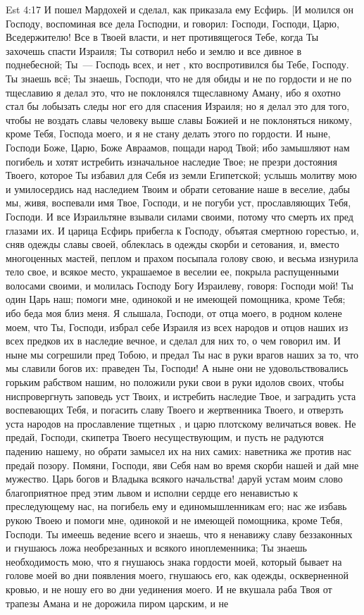 \rsbpar\vs Est 4:17 И пошел Мардохей и сделал, как приказала ему Есфирь. [И молился он Господу, воспоминая все дела Господни, и говорил: Господи, Господи, Царю, Вседержителю! Все в Твоей власти, и нет противящегося Тебе, когда Ты захочешь спасти Израиля; Ты сотворил небо и землю и все дивное в поднебесной; Ты~--- Господь всех, и нет , кто воспротивился бы Тебе, Господу. Ты знаешь всё; Ты знаешь, Господи, что не для обиды и не по гордости и не по тщеславию я делал это, что не поклонялся тщеславному Аману, ибо я охотно стал бы лобызать следы ног его для спасения Израиля; но я делал это для того, чтобы не воздать славы человеку выше славы Божией и не поклоняться никому, кроме Тебя, Господа моего, и я не стану делать этого по гордости. И ныне, Господи Боже, Царю, Боже Авраамов, пощади народ Твой; ибо замышляют нам погибель и хотят истребить изначальное наследие Твое; не презри достояния Твоего, которое Ты избавил для Себя из земли Египетской; услышь молитву мою и умилосердись над наследием Твоим и обрати сетование наше в веселие, дабы мы, живя, воспевали имя Твое, Господи, и не погуби уст, прославляющих Тебя, Господи. И все Израильтяне взывали  силами своими, потому что смерть их  пред глазами их. И царица Есфирь прибегла к Господу, объятая смертною горестью, и, сняв одежды славы своей, облеклась в одежды скорби и сетования, и, вместо многоценных мастей, пеплом и прахом посыпала голову свою, и весьма изнурила тело свое, и всякое место, украшаемое в веселии ее, покрыла распущенными волосами своими, и молилась Господу Богу Израилеву, говоря: Господи мой! Ты один Царь наш; помоги мне, одинокой и не имеющей помощника, кроме Тебя; ибо беда моя близ меня. Я слышала, Господи, от отца моего, в родном колене моем, что Ты, Господи, избрал себе Израиля из всех народов и отцов наших из всех предков их в наследие вечное, и сделал для них то, о чем говорил им. И ныне мы согрешили пред Тобою, и предал Ты нас в руки врагов наших за то, что мы славили богов их: праведен Ты, Господи! А ныне они не удовольствовались горьким рабством нашим, но положили руки свои в руки идолов своих, чтобы ниспровергнуть заповедь уст Твоих, и истребить наследие Твое, и заградить уста воспевающих Тебя, и погасить славу  Твоего и жертвенника Твоего, и отверзть уста народов на прославление тщетных , и царю плотскому величаться вовек. Не предай, Господи, скипетра Твоего  несуществующим, и пусть не радуются падению нашему, но обрати замысел их на них самих: наветника же против нас предай позору. Помяни, Господи, яви Себя нам во время скорби нашей и дай мне мужество. Царь богов и Владыка всякого начальства! даруй устам моим слово благоприятное пред этим львом и исполни сердце его ненавистью к преследующему нас, на погибель ему и единомышленникам его; нас же избавь рукою Твоею и помоги мне, одинокой и не имеющей помощника, кроме Тебя, Господи. Ты имеешь ведение всего и знаешь, что я ненавижу славу беззаконных и гнушаюсь ложа необрезанных и всякого иноплеменника; Ты знаешь необходимость мою, что я гнушаюсь знака гордости моей, который бывает на голове моей во дни появления моего, гнушаюсь его, как одежды, оскверненной кровью, и не ношу его во дни уединения моего. И не вкушала раба Твоя от трапезы Амана и не дорожила пиром царским, и не 